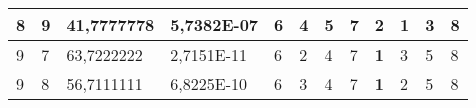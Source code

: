 \documentclass[conference]{IEEEtran}
\begin{document}
\begin{table*}[]
\begin{tabular}{|llll|llllllll|}
\multicolumn{1}{|l|}{8}                                                     & \multicolumn{1}{l|}{9}                                                        & \multicolumn{1}{l|}{41,7777778}                                                   & 5,7382E-07                     & \multicolumn{1}{l|}{6}                                                  & \multicolumn{1}{l|}{4}                                                  & \multicolumn{1}{l|}{5}                                                  & \multicolumn{1}{l|}{7}                                                  & \multicolumn{1}{l|}{2}                                                  & \multicolumn{1}{l|}{\textbf{1}}                                         & \multicolumn{1}{l|}{3}                                                  & 8                          \\ \hline
\multicolumn{1}{|l|}{9}                                                     & \multicolumn{1}{l|}{7}                                                        & \multicolumn{1}{l|}{63,7222222}                                                   & 2,7151E-11                     & \multicolumn{1}{l|}{6}                                                  & \multicolumn{1}{l|}{2}                                                  & \multicolumn{1}{l|}{4}                                                  & \multicolumn{1}{l|}{7}                                                  & \multicolumn{1}{l|}{\textbf{1}}                                         & \multicolumn{1}{l|}{3}                                                  & \multicolumn{1}{l|}{5}                                                  & 8                          \\ \hline
\multicolumn{1}{|l|}{9}                                                     & \multicolumn{1}{l|}{8}                                                        & \multicolumn{1}{l|}{56,7111111}                                                   & 6,8225E-10                     & \multicolumn{1}{l|}{6}                                                  & \multicolumn{1}{l|}{3}                                                  & \multicolumn{1}{l|}{4}                                                  & \multicolumn{1}{l|}{7}                                                  & \multicolumn{1}{l|}{\textbf{1}}                                         & \multicolumn{1}{l|}{2}                                                  & \multicolumn{1}{l|}{5}                                                  & 8                          \\ \hline

\end{tabular}
\end{table*}
\end{document}
